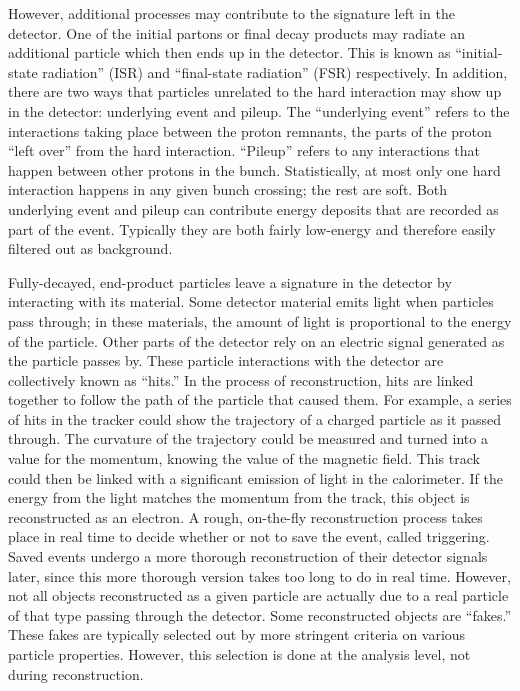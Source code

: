 However, additional processes may contribute 
to the signature left in the detector.  
One of the initial partons 
or final decay products 
may radiate an additional particle 
which then ends up in the detector.  
This is known as ``initial-state radiation'' (ISR) 
and ``final-state radiation'' (FSR) respectively.  
In addition, there are two ways that 
particles unrelated to the hard interaction 
may show up in the detector: 
underlying event and pileup.  
The ``underlying event'' refers to the 
interactions taking place between the 
proton remnants, 
the parts of the proton ``left over'' 
from the hard interaction.  
``Pileup'' refers to any interactions that happen 
between other protons in the bunch.  
Statistically, at most only one hard interaction 
happens in any given bunch crossing; the rest are soft.  
Both underlying event and pileup can contribute 
energy deposits that are recorded as part of the event.  
Typically they are both fairly low-energy and 
therefore easily filtered out as background.  


Fully-decayed, end-product 
particles leave a signature in the detector 
by interacting with its material.  
Some detector material emits light when 
particles pass through; 
in these materials, the amount of light 
is proportional to the energy of the particle.  
Other parts of the detector rely on an 
electric signal generated 
as the particle passes by.  
These particle interactions with the detector 
are collectively known as ``hits.''  
In the process of reconstruction, 
hits are linked together to 
follow the path of the particle that caused them.  
For example, a series of hits in the tracker 
could show the trajectory of a charged particle 
as it passed through.  
The curvature of the trajectory could be measured 
and turned into a value for the momentum, 
knowing the value of the magnetic field.  
This track could then be linked 
with a significant emission of light 
in the calorimeter.  
If the energy from the light 
matches the momentum from the track, 
this object is reconstructed as an electron.  
A rough, on-the-fly reconstruction 
process takes place in real time to decide 
whether or not to save the event, 
called triggering.  
Saved events undergo a more thorough 
reconstruction of their detector signals later, 
since this more thorough version 
takes too long to do in real time.  
However, not all objects reconstructed as 
a given particle are actually due to 
a real particle of that type 
passing through the detector.  
Some reconstructed objects are ``fakes.''  
These fakes are typically selected out 
by more stringent criteria on various 
particle properties. %
However, this selection is done at the analysis level, 
not during reconstruction.  

